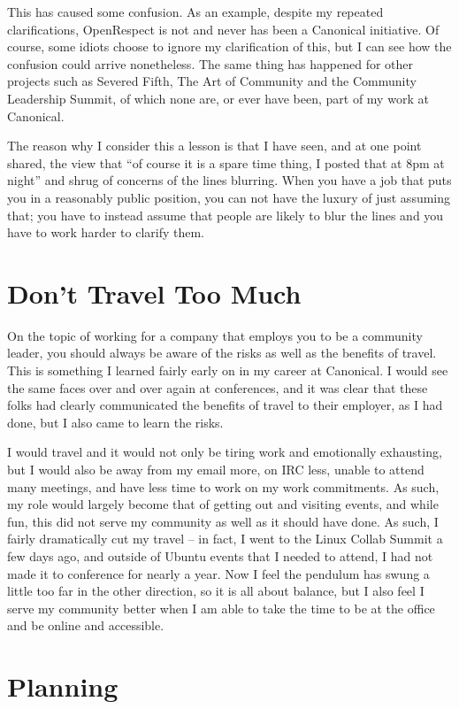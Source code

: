 This has caused some confusion. As an example, despite my repeated
clarifications, OpenRespect is not and never has been a Canonical initiative. Of
course, some idiots choose to ignore my clarification of this, but I can see how
the confusion could arrive nonetheless. The same thing has happened for other
projects such as Severed Fifth, The Art of Community and the Community
Leadership Summit, of which none are, or ever have been, part of my work at
Canonical.

The reason why I consider this a lesson is that I have seen, and at one point
shared, the view that ``of course it is a spare time thing, I posted that at 8pm
at night'' and shrug of concerns of the lines blurring. When you have a job that
puts you in a reasonably public position, you can not have the luxury of just
assuming that; you have to instead assume that people are likely to blur the
lines and you have to work harder to clarify them.

\section*{Don’t Travel Too Much}

On the topic of working for a company that employs you to be a community leader,
you should always be aware of the risks as well as the benefits of travel. This
is something I learned fairly early on in my career at Canonical. I would see
the same faces over and over again at conferences, and it was clear that these
folks had clearly communicated the benefits of travel to their employer, as I
had done, but I also came to learn the risks.

I would travel and it would not only be tiring work and emotionally exhausting,
but I would also be away from my email more, on IRC less, unable to attend many
meetings, and have less time to work on my work commitments. As such, my role
would largely become that of getting out and visiting events, and while fun,
this did not serve my community as well as it should have done. As such, I
fairly dramatically cut my travel -- in fact, I went to the Linux Collab Summit
a few days ago, and outside of Ubuntu events that I needed to attend, I had not
made it to conference for nearly a year. Now I feel the pendulum has swung a
little too far in the other direction, so it is all about balance, but I also
feel I serve my community better when I am able to take the time to be at the
office and be online and accessible.

\section*{Planning}

